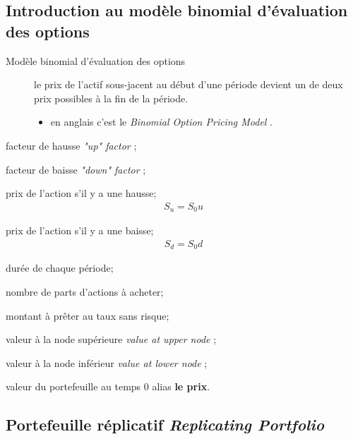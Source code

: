 \documentclass[10pt, french]{article}
\begin{document}
\begin{multicols*}{2}
\newpage
\section{Introduction au modèle binomial d'évaluation des options}

\begin{description}
	\item[Modèle binomial d'évaluation des options]	le prix de l'actif sous-jacent au début d'une période devient un de deux prix possibles à la fin de la période.
		\begin{itemize}
		\item	en anglais c'est le \og \textit{Binomial Option Pricing Model} \fg{}.
		\end{itemize}
\end{description}

\begin{distributions}
\begin{description}[leftmargin = *]
	\item[$u$]	facteur de hausse \og \textit{"up" factor} \fg{};
	\item[$d$]	facteur de baisse \og \textit{"down" factor} \fg{};	
	\item[$S_{u}$]	prix de l'action s'il y a une hausse;
		\begin{align*}
		S_{u} = S_{0} u
		\end{align*}
	\item[$S_{d}$]	prix de l'action s'il y a une baisse;
		\begin{align*}
		S_{d} = S_{0} d
		\end{align*}
	\item[$h$]	durée de chaque période;
	\item[$\Delta$]	nombre de parts d'actions à acheter;
	\item[$B$]	montant à prêter au taux sans risque;
	\item[$V_{u}$]	valeur à la node supérieure \og \textit{value at upper node} \fg{};
	\item[$V_{d}$]	valeur à la node inférieur \og \textit{value at lower node} \fg{};
	\item[$V_{0}$]	valeur du portefeuille au temps $0$ alias \textbf{le prix}.
\end{description}
\end{distributions}

\columnbreak
\subsection{Portefeuille réplicatif \og \textit{Replicating Portfolio} \fg{}}


\end{multicols*}
\end{document}
